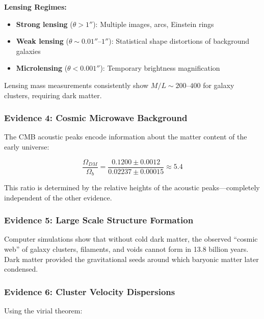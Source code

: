 \documentclass[11pt,a4paper]{article}
\begin{document}
\textbf{Lensing Regimes:}

\begin{itemize}[noitemsep]
    \item \textbf{Strong lensing} ($\theta > 1''$): Multiple images, arcs, Einstein rings
    \item \textbf{Weak lensing} ($\theta \sim 0.01''$--$1''$): Statistical shape distortions of background galaxies
    \item \textbf{Microlensing} ($\theta < 0.001''$): Temporary brightness magnification
\end{itemize}

Lensing mass measurements consistently show $M/L \sim 200$--$400$ for galaxy clusters, requiring dark matter.

\subsubsection{Evidence 4: Cosmic Microwave Background}

The CMB acoustic peaks encode information about the matter content of the early universe:

\begin{equationbox}
\begin{equation}
\frac{\Omega_{DM}}{\Omega_b} = \frac{0.1200 \pm 0.0012}{0.02237 \pm 0.00015} \approx 5.4
\label{eq:cmb_ratio}
\end{equation}
\end{equationbox}

This ratio is determined by the relative heights of the acoustic peaks---completely independent of the other evidence.

\subsubsection{Evidence 5: Large Scale Structure Formation}

Computer simulations show that without cold dark matter, the observed ``cosmic web'' of galaxy clusters, filaments, and voids cannot form in 13.8 billion years. Dark matter provided the gravitational seeds around which baryonic matter later condensed.

\subsubsection{Evidence 6: Cluster Velocity Dispersions}

Using the virial theorem:
\end{document}
